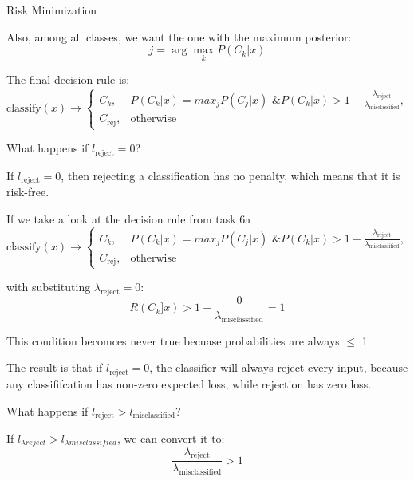 \documentclass[
	english,
        solution=true
	]{tudaexercise}
\begin{document}
\begin{task}[points=11]{Risk Minimization}
\begin{subtask}[points=3]
\begin{solution}
Also, among all classes, we want the one with the maximum posterior:
\[
j = \arg \max_k P(C_k | x)
\]

The final decision rule is:
\[
\text{classify}(x) \to \begin{cases}
C_k, & {P(C_k | x ) = max_j P(C_j | x) \text{ \& }  P(C_k | x ) > 1 - \frac{\lambda_\text{reject}}{\lambda_\text{misclassified}}}, \\
C_{\text{rej}}, & \text{otherwise}
\end{cases}
\]

\end{solution}
\end{subtask}

\vspace{2em}

\begin{subtask}[points=2]
What happens if $l_{\text{reject}} = 0$?

\begin{solution}
If $l_{\text{reject}} = 0$, then rejecting a classification has no penalty, which means that it is risk-free.

If we take a look at the decision rule from task 6a
\[
\text{classify}(x) \to \begin{cases}
C_k, & {P(C_k | x ) = max_j P(C_j | x) \text{ \& }  P(C_k | x ) > 1 - \frac{\lambda_\text{reject}}{\lambda_\text{misclassified}}}, \\
C_{\text{rej}}, & \text{otherwise}
\end{cases}
\]

with substituting $\lambda_{\text{reject}} = 0$:
\[
R(C_k ] x ) > 1 - \frac{0}{\lambda_\text{misclassified}} = 1
\]

This condition becomces never true becuase probabilities are always $\leq$ 1

The result is that if $l_{\text{reject}} = 0$, the classifier will always reject every input, because any classififcation has non-zero expected loss, while rejection has zero loss.

\end{solution} 
\end{subtask}

\vspace{2em}
\begin{subtask}[points=1]

 What happens if $l_{\text{reject}} > l_{\text{misclassified}}$? 

\begin{solution}
If $l_{\lambda{reject}} > l_{\lambda{misclassified}}$, we can convert it to:
\[
\frac{\lambda_\text{reject}}{\lambda_\text{misclassified}} > 1
\]


\end{solution}
\end{subtask}
\end{task}
\end{document}
